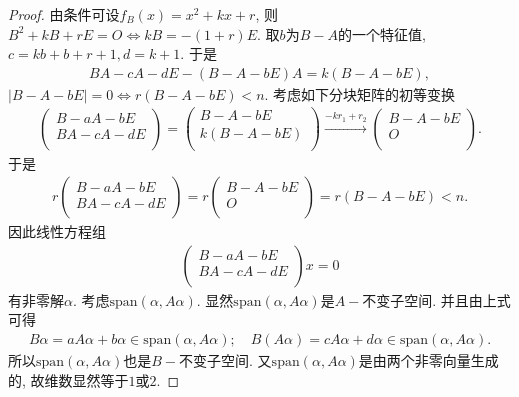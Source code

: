 \documentclass[../../main.tex]{subfiles}%
\begin{document}
\begin{proof}
由条件可设$f_B\left( x \right) =x^2+kx+r$, 则
$B^2+kB+rE=O\Longleftrightarrow kB=-\left( 1+r \right) E.$
取$b$为$B-A$的一个特征值, $c=kb+b+r+1,d=k+1$. 于是
\begin{align*}
BA-cA-dE-\left( B-A-bE \right) A=k\left( B-A-bE \right) ,
\end{align*}
$| B-A-bE |=0\Longleftrightarrow r\left( B-A-bE \right) <n.$
考虑如下分块矩阵的初等变换
\begin{align*}
\left( \begin{array}{c}
B-aA-bE\\
BA-cA-dE\\
\end{array} \right) =\left( \begin{array}{c}
B-A-bE\\
k\left( B-A-bE \right)\\
\end{array} \right) \xrightarrow{-kr_1+r_2}\left( \begin{array}{c}
B-A-bE\\
O\\
\end{array} \right) .
\end{align*}
于是
\begin{align*}
r\left( \begin{array}{c}
B-aA-bE\\
BA-cA-dE\\
\end{array} \right) =r\left( \begin{array}{c}
B-A-bE\\
O\\
\end{array} \right) =r\left( B-A-bE \right) <n.
\end{align*}
因此线性方程组
\begin{align*}
\left( \begin{array}{c}
B-aA-bE\\
BA-cA-dE\\
\end{array} \right) x=0
\end{align*}
有非零解$\alpha$. 考虑$\mathrm{span}\left( \alpha ,A\alpha \right)$. 显然$\mathrm{span}\left( \alpha ,A\alpha \right)$是$A-$不变子空间. 并且由上式可得
\begin{align*}
B\alpha =aA\alpha +b\alpha \in \mathrm{span}\left( \alpha ,A\alpha \right) ;\quad B\left( A\alpha \right) =cA\alpha +d\alpha \in \mathrm{span}\left( \alpha ,A\alpha \right) .
\end{align*}
所以$\mathrm{span}\left( \alpha ,A\alpha \right)$也是$B-$不变子空间. 又$\mathrm{span}\left( \alpha ,A\alpha \right)$是由两个非零向量生成的, 故维数显然等于$1$或$2$.
\end{proof}
\end{document}
